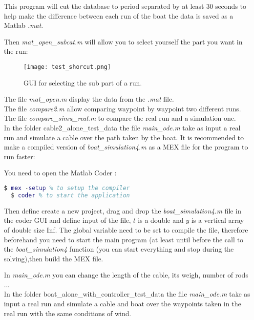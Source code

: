 \documentclass[twoside,12pt]{report} %
\begin{document}
This program will cut the database to period separated by at least 30 seconds to help make the difference between each run of the boat the data is saved as a Matlab \textit{.mat}.

Then \textit{mat\_open\_subcat.m} will allow you to select yourself the part you want in the run:

\begin{figure}[H]
\centering
    \texttt{[image: test\_shorcut.png]}
    \caption*{GUI for selecting the sub part of a run.}
    \label{fig:test_shorcut}
\end{figure}

The file \textit{mat\_open.m} display the data from the \textit{.mat} file.\\
The file \textit{compare2.m} allow comparing waypoint by waypoint two different runs.\\
The file \textit{compare\_simu\_real.m} to compare the real run and a simulation one.\\


In the folder cable2\_alone\_test\_data the file \textit{main\_ode.m}  take as input a real run and simulate
a cable over the path taken by the boat. It is recommended to make a compiled version of \textit{boat\_simulation4.m} as a MEX file for the program to run faster:

You need to open the Matlab Coder :
\begin{lstlisting}[language=matlab]
  $ mex -setup % to setup the compiler
  $ coder % to start the application
\end{lstlisting}

Then define create a new project, drag and drop the \textit{boat\_simulation4.m} file in the coder GUI and define input of the file, $t$ is a double and $y$ is a vertical array of double size Inf. The global variable need to be set to compile the file, therefore beforehand you need to start the main program (at least until before the call to the   \textit{boat\_simulation4} function (you can start everything and stop during the solving),then build the MEX file.

In \textit{main\_ode.m} you can change the length of the cable, its weigh, number of rods ... \\


In the folder boat\_alone\_with\_controller\_test\_data the file \textit{main\_ode.m}  take as input a real run and simulate
a cable and boat over the waypoints taken in the real run with the same conditions of wind. \\
\end{document}
